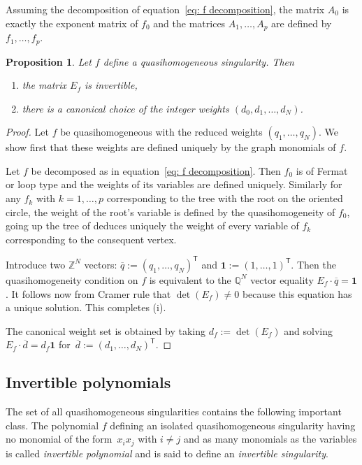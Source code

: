 \documentclass[10pt,a4paper]{article}
\numberwithin{equation}{section}
\newtheorem{Proposition}[Theorem]{Proposition}
 { \theoremstyle{definition}
\newtheorem{Definition}[Theorem]{Definition}
\newtheorem{Note}[Theorem]{Note}
\newtheorem{Example}[Theorem]{Example}
\newtheorem{Remark}[Theorem]{Remark} }
\newcommand{\QQ}{{\mathbb{Q}}}
\newcommand{\ZZ}{{\mathbb{Z}}}
\begin{document}
Assuming the decomposition of equation~\eqref{eq: f decomposition}, the matrix $A_0$ is exactly the exponent matrix of $f_0$ and the matrices $A_1,\dots,A_p$ are defined by $f_1,\dots,f_p$.

\begin{Proposition}\label{prop: graph exponent matrix is invertible}
	Let $f$ define a quasihomogeneous singularity. Then
	\begin{enumerate}\itemsep=0pt
	 \item[$(i)$] the matrix $E_f$ is invertible,
	 \item[$(ii)$] there is a canonical choice of the integer weights $(d_0,d_1,\dots,d_N)$.
	\end{enumerate}
\end{Proposition}
\begin{proof}
	Let $f$ be quasihomogeneous with the reduced weights $(q_1,\dots,q_N)$. We show first that these weights are defined uniquely by the graph monomials of $f$.


 Let $f$ be decomposed as in equation~\eqref{eq: f decomposition}. Then $f_0$ is of Fermat or loop type and the weights of its variables are defined uniquely. Similarly for any $f_k$ with $k=1,\dots,p$ corresponding to the tree with the root on the oriented circle, the weight of the root's variable is defined by the quasihomogeneity of $f_0$, going up the tree of deduces uniquely the weight of every variable of $f_k$ corresponding to the consequent vertex.

 Introduce two $\ZZ^N$ vectors: $\overline{q} := (q_1,\dots,q_N)^{\mathsf{T}}$ and $\boldsymbol{1} := (1,\dots,1)^{\mathsf{T}}$. Then the quasihomogeneity condition on $f$ is equivalent to the $\QQ^N$ vector equality $E_f \cdot \overline{q} = \boldsymbol{1}$. It follows now from Cramer rule that $\det(E_f) \neq 0$ because this equation has a unique solution. This completes (i).

	The canonical weight set is obtained by taking $d_f := \det(E_f)$ and solving $E_f \cdot \overline{d} = d_f \boldsymbol{1}$ for~$\overline{d} := (d_1,\dots,d_N)^{\mathsf{T}}$.
\end{proof}

\subsection{Invertible polynomials}\label{sec: invertible polynomials}

The set of all quasihomogeneous singularities contains the following important class. The polynomial $f$ defining an isolated quasihomogeneous singularity having no monomial of the form~$x_ix_j$ with $i\ne j$ and as many monomials as the variables is called \textit{invertible polynomial} and is said to define an \textit{invertible singularity}.
\end{document}
